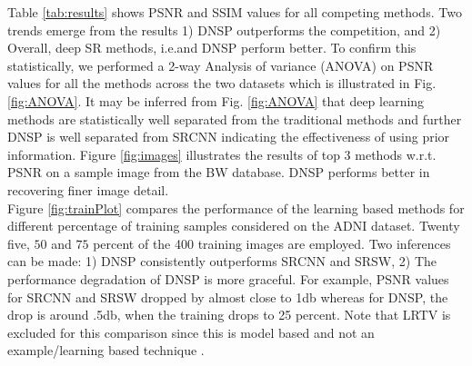 \documentclass{article}
\def\sqz{\vspace{-3pt}}
\begin{document}
\vspace{-.5cm}
\begin{table}[h]
\caption{\small{PSNR and SSIM comparisons}}
\label{tab:results}
\vspace{-.5cm}
\begin{center}
\end{center}
\end{table}

\sqz\sqz\sqz\sqz\sqz\sqz
\noindent Table \ref{tab:results} shows PSNR and SSIM values for all competing methods. Two trends emerge from the results 1) DNSP outperforms the competition, and 2) Overall, deep SR methods, i.e.\SRCNN and DNSP perform better. To confirm this statistically, we performed a 2-way Analysis of variance (ANOVA) on PSNR values for all the methods across the two datasets which is illustrated in Fig. \ref{fig:ANOVA}. It may be inferred from Fig. \ref{fig:ANOVA} that deep learning methods are statistically well separated from the traditional methods and further DNSP is well separated from SRCNN indicating the effectiveness of using prior information. Figure \ref{fig:images} illustrates the results of top 3 methods w.r.t. PSNR on a sample image from the BW database. DNSP performs better in recovering  finer image detail. \\
Figure \ref{fig:trainPlot} compares the performance of the learning based methods for different percentage of training samples considered on the ADNI dataset. Twenty five, $50$ and $75$ percent of the 400 training images are employed. Two inferences can be made: 1) DNSP consistently outperforms  SRCNN and SRSW, 2) The performance degradation of DNSP is more graceful. For example, PSNR values for SRCNN and SRSW dropped by almost close to 1db whereas for DNSP, the drop is around .5db, when the training drops to 25 percent.
Note that LRTV is excluded for this comparison since this is model based and not an example/learning based technique \cite{shi2015lrtv}.
\end{document}

